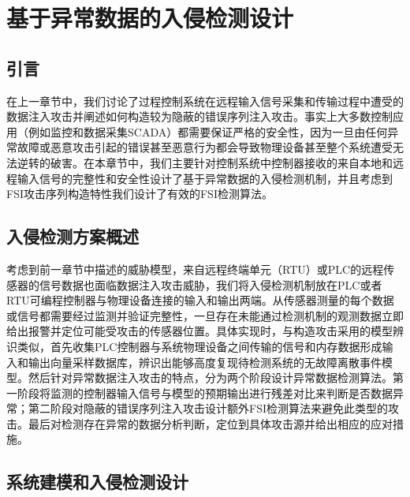
\chapter{基于异常数据的入侵检测设计}
\label{chap:data detection}

\section{引言}
\label{sec:intro}

在上一章节中，我们讨论了过程控制系统在远程输入信号采集和传输过程中遭受的数据注入攻击并阐述如何构造较为隐蔽的错误序列注入攻击。事实上大多数控制应用（例如监控和数据采集SCADA）都需要保证严格的安全性，因为一旦由任何异常故障或恶意攻击引起的错误甚至恶意行为都会导致物理设备甚至整个系统遭受无法逆转的破害。在本章节中，我们主要针对控制系统中控制器接收的来自本地和远程输入信号的完整性和安全性设计了基于异常数据的入侵检测机制，并且考虑到FSI攻击序列构造特性我们设计了有效的FSI检测算法。

\section{入侵检测方案概述}
\label{sec:list}

考虑到前一章节中描述的威胁模型，来自远程终端单元（RTU）或PLC的远程传感器的信号数据也面临数据注入攻击威胁，我们将入侵检测机制放在PLC或者RTU可编程控制器与物理设备连接的输入和输出两端。从传感器测量的每个数据或信号都需要经过监测并验证完整性，一旦存在未能通过检测机制的观测数据立即给出报警并定位可能受攻击的传感器位置。具体实现时，与构造攻击采用的模型辨识类似，首先收集PLC控制器与系统物理设备之间传输的信号和内存数据形成输入和输出向量采样数据库，辨识出能够高度复现待检测系统的无故障离散事件模型。然后针对异常数据注入攻击的特点，分为两个阶段设计异常数据检测算法。第一阶段将监测的控制器输入信号与模型的预期输出进行残差对比来判断是否数据异常；第二阶段对隐蔽的错误序列注入攻击设计额外FSI检测算法来避免此类型的攻击。最后对检测存在异常的数据分析判断，定位到具体攻击源并给出相应的应对措施。

\section{系统建模和入侵检测设计}
\label{sec:matheq}

